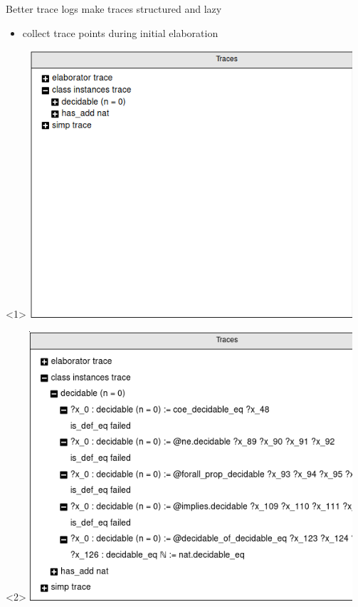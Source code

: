 \documentclass[t]{beamer}
\begin{document}
\begin{frame}{Better trace logs }
  make traces structured and lazy

  \bigskip

  \begin{minipage}{0.4\linewidth}
    \begin{itemize}
    \item collect trace points during initial elaboration
    \end{itemize}
    \vfill
  \end{minipage}%
  \begin{minipage}{0.6\linewidth} 
    \begin{center}
      \begin{onlyenv}<1> \includegraphics[width=0.9\textwidth]{traces}
      \end{onlyenv}%
      \begin{onlyenv}<2> \includegraphics[width=0.9\textwidth]{traces_full}
      \end{onlyenv}
    \end{center}
  \end{minipage}
\end{frame}
\end{document}
